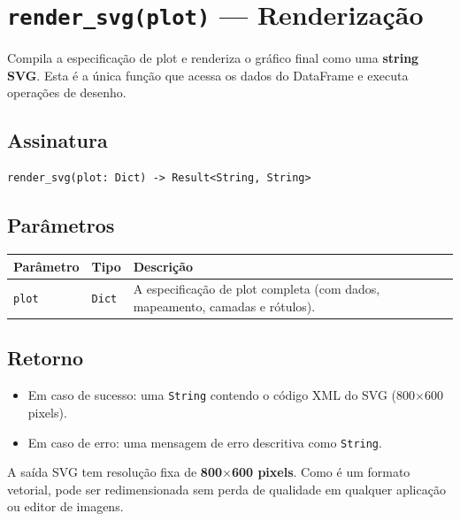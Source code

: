 \documentclass[12pt, a4paper, oneside]{book}
\newcommand{\code}[1]{\texttt{#1}}
\begin{document}
\section{\texttt{render\_svg(plot)} --- Renderização}

Compila a especificação de plot e renderiza o gráfico final como uma
\textbf{string SVG}. Esta é a única função que acessa os dados do DataFrame
e executa operações de desenho.

\subsection*{Assinatura}

\begin{lstlisting}[style=inline]
render_svg(plot: Dict) -> Result<String, String>
\end{lstlisting}

\subsection*{Parâmetros}

\begin{tabularx}{\textwidth}{@{}lL{2.5cm}X@{}}
  \toprule
  \textbf{Parâmetro} & \textbf{Tipo} & \textbf{Descrição} \\
  \midrule
  \code{plot} & \code{Dict} & A especificação de plot completa (com dados, mapeamento,
                              camadas e rótulos). \\
  \bottomrule
\end{tabularx}

\subsection*{Retorno}

\begin{itemize}
  \item Em caso de sucesso: uma \code{String} contendo o código XML do SVG
        (800$\times$600 pixels).
  \item Em caso de erro: uma mensagem de erro descritiva como \code{String}.
\end{itemize}

\begin{infobox}[title={\textbf{Nota:} Dimensões do SVG}]
  A saída SVG tem resolução fixa de \textbf{800$\times$600 pixels}. Como é um
  formato vetorial, pode ser redimensionada sem perda de qualidade em qualquer
  aplicação ou editor de imagens.
\end{infobox}
\end{document}
